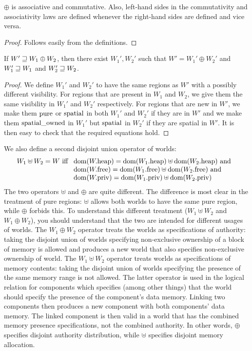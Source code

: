 \documentclass[a4paper]{article}
\begin{document}
\begin{lemma}
  \label{lem:oplus-assoc-comm}
  $\oplus$ is associative and commutative.
  Also, left-hand sides in the commutativity and associativity laws are defined whenever the right-hand sides are defined and vice versa.
\end{lemma}
\begin{proof}
  Follows easily from the definitions.
\end{proof}

\begin{lemma}
  \label{lem:oplus-future-distr}
  If $W' \future W_1 \oplus W_2$, then there exist $W_1',W_2'$ such that $W' = W_1' \oplus W_2'$ and $W_1' \future W_1$ and $W_2' \future W_2$.
\end{lemma}
\begin{proof}
  We define $W_1'$ and $W_2'$ to have the same regions as $W'$ with a possibly different visibility.
  For regions that are present in $W_1$ and $W_2$, we give them the same visibility in $W_1'$ and $W_2'$ respectively.
  For regions that are new in $W'$, we make them $\pure$ or $\spatial$ in both $W_1'$ and $W_2'$ if they are in $W'$ and we make them $\spatialo$ in $W_1'$ but $\spatial$ in $W_2'$ if they are spatial in $W'$.
  It is then easy to check that the required equations hold.
\end{proof}

We also define a second disjoint union operator of worlds:
\[
  W_1 \uplus W_2 = W
  \text{ iff }
  \begin{array}[t]{l}
    \dom(\pwheap) = \dom(\pwheap[W_1]) \uplus \dom(\pwheap[W_2]) \tand \\
    \dom(\pwfree) = \dom(\pwfree[W_1]) \uplus \dom(\pwfree[W_2]) \tand \\
    \dom(\pwpriv) = \dom(\pwpriv[W_1]) \uplus \dom(\pwpriv[W_2]) \\
  \end{array}
\]
The two operators $\uplus$ and $\oplus$ are quite different.
The difference is most clear in the treatment of pure regions: $\uplus$ allows both worlds to have the same pure region, while $\oplus$ forbids this.
To understand this different treatment ($W_1 \uplus W_2$ and $W_1 \oplus W_2$), you should understand that the two are intended for different usages of worlds.
The $W_1 \oplus W_2$ operator treats the worlds as specifications of authority: taking the disjoint union of worlds specifying non-exclusive ownership of a block of memory is allowed and produces a new world that also specifies non-exclusive ownership of world. 
The $W_1 \uplus W_2$  operator treats worlds as specifications of memory contents: taking the disjoint union of worlds specifying the presence of the same memory range is not allowed.
The latter operator is used in the logical relation for components which specifies (among other things) that the world should specify the presence of the component's data memory.
Linking two components then produces a new component with both components' data memory.
The linked component is then valid in a world that has the combined memory presence specifications, not the combined authority.
In other words, $\oplus$ specifies disjoint authority distribution, while $\uplus$ specifies disjoint memory allocation.
\end{document}
